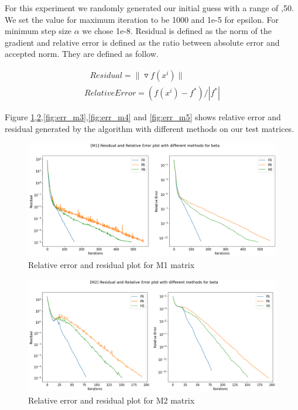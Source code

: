 \documentclass{article}
\numberwithin{equation}{section}
\begin{document}
 For this experiment we randomly generated our initial guess with a range of ,50\rbrack . We set the value for maximum iteration to be 1000 and 1e-5 for epsilon. For minimum step size $\alpha$ we chose 1e-8. Residual is defined as the norm of the gradient and relative error is defined as the ratio between absolute error and accepted norm. They are defined as follow.
 
 \begin{equation}
    \begin{multlined}
     ~~~Residual = \|\triangledown f(x^i)\|\\
     Relative Error = (f(x^i) - f^*) / |f^*|
    \end{multlined}
\end{equation}

 
 Figure \ref{fig:err_m1},\ref{fig:err_m2},\ref{fig:err_m3},\ref{fig:err_m4} and \ref{fig:err_m5} shows relative error and residual generated by the algorithm with different methods on our test matrices.

\begin{figure}[H]
    \centering
    \includegraphics[scale=0.28]{cgd/M1.png}
    \caption{Relative error and residual plot for M1 matrix}
    \label{fig:err_m1}
\end{figure}

\begin{figure}[H]
    \centering
    \includegraphics[scale=0.25]{cgd/M2.png}
    \caption{Relative error and residual plot for M2 matrix}
    \label{fig:err_m2}
\end{figure}
\end{document}
